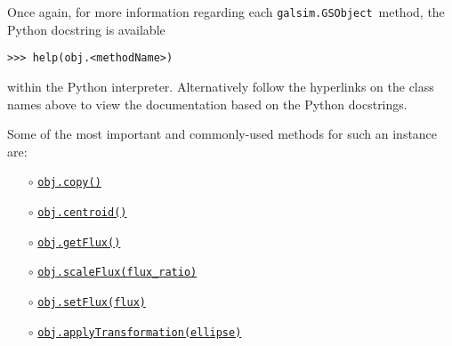 \documentclass[preprint,11pt]{../../devel/modules/aastex}
\begin{document}
Once again, for more information regarding each \texttt{galsim.GSObject}~method,
the Python docstring is available

{\tt >>> help(obj.<methodName>)}

within the Python interpreter.  Alternatively follow the hyperlinks on
the class names above to view the documentation based
on the Python docstrings. 

Some of the most important and commonly-used methods for such an
instance are:
\begin{itemize}
\item[$\circ$]
  \href{http://galsim-developers.github.com/GalSim/classgalsim_1_1base_1_1_g_s_object.html#aa0b398d4b0fca70211e4a73f81ea7e1a}{\texttt{obj.copy()}}
\item[$\circ$]
  \href{http://galsim-developers.github.com/GalSim/classgalsim_1_1base_1_1_g_s_object.html#a662d8ce421ecd90080bdcaaf6890aed8}{\texttt{obj.centroid()}}
\item[$\circ$]
  \href{http://galsim-developers.github.com/GalSim/classgalsim_1_1base_1_1_g_s_object.html#a662d8ce421ecd90080bdcaaf6890aed8}{\texttt{obj.getFlux()}}
\item[$\circ$]\href{http://galsim-developers.github.com/GalSim/classgalsim_1_1base_1_1_g_s_object.html#af4193645a9af52e7d54a044cafec8ab9}{\texttt{obj.scaleFlux(flux\_ratio)}}
\item[$\circ$]
  \href{http://galsim-developers.github.com/GalSim/classgalsim_1_1base_1_1_g_s_object.html#a1993652591ddc802b734186391b28894}{\texttt{obj.setFlux(flux)}}
\item[$\circ$]
\href{http://galsim-developers.github.com/GalSim/classgalsim_1_1base_1_1_g_s_object.html#ad491a1276fda07b148c6466d5dbd07b1}{\texttt{obj.applyTransformation(ellipse)}}

\end{itemize}
\end{document}
